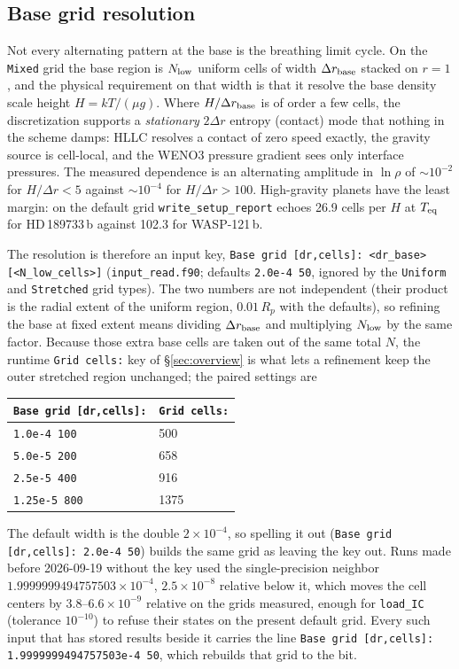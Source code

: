 \documentclass[english,a4paper]{my_memo}
\begin{document}
\subsection{Base grid resolution}
\label{sec:basegrid}

Not every alternating pattern at the base is the breathing limit cycle.
On the \texttt{Mixed} grid the base region is $N_{\rm low}$ uniform cells
of width $\Delta r_{\rm base}$ stacked on $r=1$, and the physical
requirement on that width is that it resolve the base density scale
height $H = kT/(\mu g)$. Where $H/\Delta r_{\rm base}$ is of order a few
cells, the discretization supports a \emph{stationary} $2\Delta r$
entropy (contact) mode that nothing in the scheme damps: HLLC resolves
a contact of zero speed exactly, the gravity source is cell-local, and
the WENO3 pressure gradient sees only interface pressures. The measured
dependence is an alternating amplitude in $\ln\rho$ of ${\sim}10^{-2}$
for $H/\Delta r < 5$ against ${\sim}10^{-4}$ for $H/\Delta r > 100$.
High-gravity planets have
the least margin: on the default grid \texttt{write\_setup\_report}
echoes 26.9 cells per $H$ at $T_{\rm eq}$ for HD\,189733\,b against
102.3 for WASP-121\,b.

The resolution is therefore an input key,
\texttt{Base grid [dr,cells]: <dr\_base> [<N\_low\_cells>]}
(\texttt{input\_read.f90}; defaults \texttt{2.0e-4 50}, ignored by the
\texttt{Uniform} and \texttt{Stretched} grid types). The two numbers are
not independent (their product is the radial extent of the uniform
region, $0.01\,R_p$ with the defaults), so refining the base at fixed
extent means dividing $\Delta r_{\rm base}$ and multiplying $N_{\rm low}$
by the same factor. Because those extra base cells are taken out of the
same total $N$, the runtime \texttt{Grid cells:} key of
\S\ref{sec:overview} is what lets a refinement keep the outer stretched
region unchanged; the paired settings are
\begin{center}\small
\begin{tabular}{@{}ll@{}}
\toprule
\texttt{Base grid [dr,cells]:} & \texttt{Grid cells:} \\
\midrule
\texttt{1.0e-4 100}  & 500 \\
\texttt{5.0e-5 200}  & 658 \\
\texttt{2.5e-5 400}  & 916 \\
\texttt{1.25e-5 800} & 1375 \\
\bottomrule
\end{tabular}
\end{center}
The default width is the double $2\times10^{-4}$, so spelling it out
(\texttt{Base grid [dr,cells]: 2.0e-4 50}) builds the same grid as leaving
the key out. Runs made before 2026-09-19 without the key used the
single-precision neighbor $1.9999999494757503\times10^{-4}$,
$2.5\times10^{-8}$ relative below it, which moves the cell centers by
$3.8$--$6.6\times10^{-9}$ relative on the grids measured, enough for \texttt{load\_IC} (tolerance
$10^{-10}$) to refuse their states on the present default grid. Every such
input that has stored results beside it carries the line
\texttt{Base grid [dr,cells]: 1.9999999494757503e-4 50}, which rebuilds that
grid to the bit.
\end{document}
